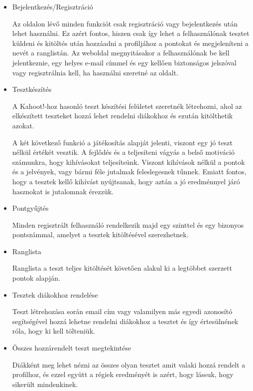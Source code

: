 \begin{itemize}
    \item {Bejelentkezés/Regisztráció}
          \begin{addmargin}[\parindent]{0pt}
              Az oldalon lévő minden funkciót csak regisztráció vagy bejelentkezés után lehet használni. Ez azért fontos, hiszen csak így lehet a felhasználónak tesztet küldeni és kitöltés után hozzáadni a profiljához a pontokat és megjeleníteni a nevét a ranglistán. Az weboldal megnyitásakor a felhasználónak be kell jelentkeznie, egy helyes e-mail címmel és egy kellően biztonságos jelszóval vagy regisztrálnia kell, ha használni szeretné az oldalt.
          \end{addmargin}
    \item {Tesztkészítés}
          \begin{addmargin}[\parindent]{0pt}
              A Kahoot!-hoz hasonló teszt készítési felületet szeretnék létrehozni, ahol az elkészített teszteket hozzá lehet rendelni diákokhoz és ezután kitölthetik azokat.

              A két következő funkció a játékosítás alapját jelenti, viszont egy jó teszt nélkül értékét vesztik. A fejlődés és a teljesíteni vágyás a belső motiváció számunkra, hogy kihívásokat teljesítsünk. Viszont kihívások nélkül a pontok és a jelvények, vagy bármi féle jutalmak feleslegesnek tűnnek. Emiatt fontos, hogy a tesztek kellő kihívást nyújtsanak, hogy aztán a jó eredménnyel járó hasznokat is jutalomnak érezzük.
          \end{addmargin}
    \item {Pontgyűjtés}
          \begin{addmargin}[\parindent]{0pt}
              Minden regisztrált felhasználó rendelkezik majd egy szinttel és egy bizonyos pontszámmal, amelyet a tesztek kitöltésével szerezhetnek.
          \end{addmargin}
    \item {Ranglista}
          \begin{addmargin}[\parindent]{0pt}
              Ranglista a teszt teljes kitöltését követően alakul ki a legtöbbet szerzett pontok alapján.
          \end{addmargin}
    \item {Tesztek diákokhoz rendelése}
          \begin{addmargin}[\parindent]{0pt}
              Teszt létrehozása során email cím vagy valamilyen más egyedi azonosító segítségével hozzá lehetne rendelni diákokhoz a tesztet és így értesülnének róla, hogy ki kell tölteniük.
          \end{addmargin}
    \item {Összes hozzárendelt teszt megtekintése}
          \begin{addmargin}[\parindent]{0pt}
              Diákként meg lehet nézni az összes olyan tesztet amit valaki hozzá rendelt a profilhoz, és ezzel együtt a régiek eredményét is azért, hogy lássuk, hogy sikerült mindenkinek.
          \end{addmargin}
\end{itemize}

